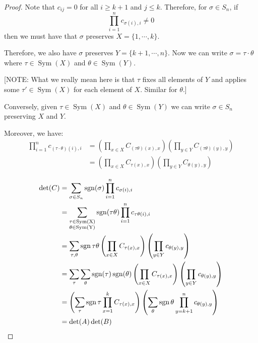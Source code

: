 \documentclass[../Main.tex]{subfiles}
\begin{document}
\begin{proof}
    Note that $c_{ij} = 0$ for all $i \geq k+1$ and $j \leq k$. Therefore, for $\sigma \in S_n$, if
    \begin{equation*}
        \prod_{i=1}^{n} c_{\sigma(i), i} \neq 0
    \end{equation*}
    then we must have that $\sigma$ preserves $X = \{1, \cdots, k\}$.

    Therefore, we also have $\sigma$ preserves $Y = \{k+1, \cdots, n\}$. Now we can write $\sigma = \tau \cdot \theta$ where $\tau \in \operatorname{Sym}(X)$ and $\theta \in \operatorname{Sym}(Y)$.

    [NOTE: What we really mean here is that $\tau$ fixes all elements of $Y$ and applies some $\tau' \in \operatorname{Sym}(X)$ for each element of $X$. Similar for $\theta$.]

    Conversely, given $\tau \in \operatorname{Sym}(X)$ and $\theta \in \operatorname{Sym}(Y)$ we can write $\sigma \in S_n$ preserving $X$ and $Y$.

    Moreover, we have:
    \begin{align*}
        \prod_{i=1}^{n} c_{(\tau \cdot \theta)(i), i} &= \left(\prod_{x \in X} C_{(\tau \theta)(x), x}\right)\left(\prod_{y \in Y} C_{(\tau \theta)(y), y}\right) \\
        &= \left(\prod_{x \in X} C_{\tau(x), x}\right)\left(\prod_{y \in Y} C_{\theta(y), y}\right) \\
    \end{align*}
    \begin{align*}
        \det(C) &= \sum_{\sigma \in S_n} \operatorname{sgn}(\sigma) \prod_{i=1}^{n} c_{\sigma(i), i}\\
        &= \sum_{\substack{\tau \in \operatorname{Sym(X)}\\\theta \in \operatorname{Sym(Y)}}} \operatorname{sgn}(\tau\theta) \prod_{i=1}^{n} c_{\tau\theta(i), i} \\
        &= \sum_{\tau, \theta} \operatorname{sgn}{\tau\theta} \left(\prod_{x \in X}C_{\tau(x), x}\right)\left(\prod_{y\in Y} c_{\theta(y), y}\right) \\
        &= \sum_\tau \sum_\theta \operatorname{sgn}(\tau) \operatorname{sgn}(\theta) \left(\prod_{x \in X}C_{\tau(x), x}\right)\left(\prod_{y\in Y} c_{\theta(y), y}\right) \\
        &= \left(\sum_\tau \operatorname{sgn}{\tau} \prod_{x=1}^kC_{\tau(x), x}\right)\left(\sum_\theta \operatorname{sgn}{\theta} \prod_{y = k+1}^n c_{\theta(y), y}\right) \\
        &= \det(A) \det(B)
    \end{align*}
\end{proof}
\end{document}
